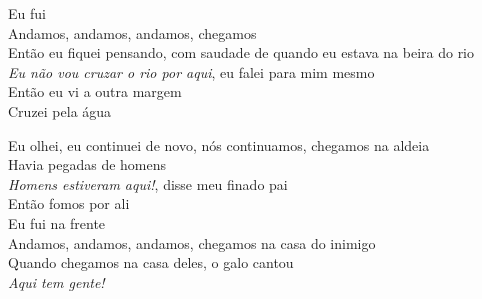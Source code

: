  \smallskip
 \begin{center}\end{center}
 \smallskip
 
\noindent   Eu fui\\
  Andamos, andamos, andamos, chegamos\\
  Então eu fiquei pensando, com saudade de quando eu estava na beira do rio\\
  \textit{Eu não vou cruzar o rio por aqui}, eu falei para mim mesmo\\
  Então eu vi a outra margem\\
  Cruzei pela água
 
 \smallskip
 \begin{center}\end{center}
 \smallskip
 
\noindent   Eu olhei, eu continuei de novo, nós continuamos, chegamos na aldeia\\
  Havia pegadas de homens\\
  \textit{Homens estiveram aqui!}, disse meu finado pai\\
  Então fomos por ali\\
  Eu fui na frente\\
  Andamos, andamos, andamos, chegamos na casa do inimigo\\
  Quando chegamos na casa deles, o galo cantou\\
  \textit{Aqui tem gente!}
 
